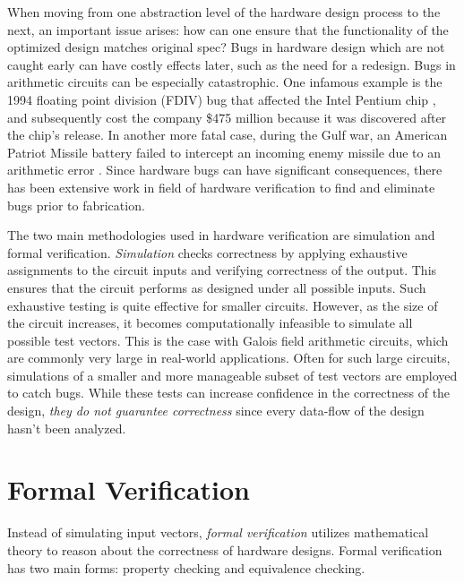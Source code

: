 When moving from one abstraction level of the hardware design process to the 
next, an important issue arises: how can one ensure that the functionality of 
the optimized design matches original spec? 
Bugs in hardware design which are 
not caught early can have costly effects later, such as the need for a 
redesign. Bugs in arithmetic circuits can be especially catastrophic.
One infamous example is the 1994 floating point division (FDIV)
bug that affected the Intel Pentium chip \cite{nicely:FDIV}, 
and subsequently cost the company \$475 million because it was  
discovered after the chip's release. In another more fatal case, during the
Gulf war, an American Patriot Missile battery failed to intercept an incoming
enemy missile due to an arithmetic error \cite{arnold:patriot}.
Since hardware bugs can have significant consequences, 
there has been extensive work in field of hardware verification to find and
eliminate bugs prior to fabrication.

The two main methodologies used in hardware verification are simulation and 
formal verification. \emph{Simulation} checks correctness by applying exhaustive 
assignments to the circuit inputs and verifying correctness of the output. 
This ensures that the circuit performs as designed under all possible 
inputs. Such exhaustive testing is quite effective for smaller circuits. 
However, as the size of the circuit increases, it becomes 
computationally infeasible to simulate all possible test vectors. This is the 
case with Galois field arithmetic circuits, which are commonly very large in 
real-world applications. Often for such large circuits, simulations of a smaller and more 
manageable subset of test vectors are employed to catch bugs. While these tests
can increase confidence in the correctness of the design,  
{\it they do not guarantee correctness} since every data-flow of the design hasn't
been analyzed.

\section{Formal Verification}
Instead of simulating input vectors, \emph{formal verification} utilizes 
mathematical theory to reason about the correctness of hardware designs.
Formal verification has two main forms: property checking and equivalence 
checking. 

